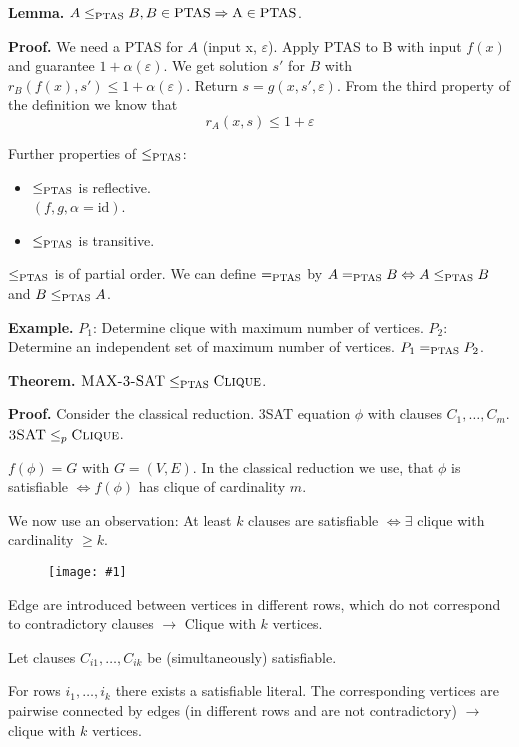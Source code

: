\documentclass[a4paper]{article}
\newcommand{\drawing}[1]{%
 \begin{figure}[ht]
  \begin{center}
   \texttt{[image: \#1]}
  \end{center}
 \end{figure}
}
\newcommand{\cls}[1]{\rm{#1}}
\newcommand{\probl}[1]{\text{\textsc{#1}}}
\begin{document}
\textbf{Lemma.}
  $A \leq_{\cls{PTAS}} B, B \in \cls{PTAS} \Rightarrow A \in \cls{PTAS}$.

\textbf{Proof.}
  We need a PTAS for $A$ (input x, $\varepsilon$).
  Apply PTAS to B with input $f(x)$ and guarantee $1 + \alpha(\varepsilon)$.
  We get solution $s'$ for $B$ with $r_B(f(x), s') \leq 1 + \alpha(\varepsilon)$.
  Return $s = g(x, s', \varepsilon)$. From the third property of the definition
  we know that
\[
  r_A(x, s) \leq 1 + \varepsilon
\]

Further properties of $\leq_{\cls{PTAS}}$:
\begin{itemize}
  \item $\leq_{\cls{PTAS}}$ is reflective. \\
        $(f, g, \alpha = \text{id})$.
  \item $\leq_{\cls{PTAS}}$ is transitive.
\end{itemize}



$\leq_{\cls{PTAS}}$ is of partial order.
We can define $=_{\cls{PTAS}}$ by $A =_{\cls{PTAS}} B \Leftrightarrow
A \leq_{\cls{PTAS}} B$ and $B \leq_{\cls{PTAS}} A$.

\textbf{Example.}
  $P_1$: Determine clique with maximum number of vertices.
  $P_2$: Determine an independent set of maximum number of vertices.
  $P_1 =_{\cls{PTAS}} P_2$.

\textbf{Theorem.}
  $\probl{MAX-3-SAT} \leq_{\cls{PTAS}} \probl{Clique}$.

\textbf{Proof.}
  Consider the classical reduction. 3SAT equation $\phi$
  with clauses $C_1, \ldots, C_m$. $\probl{3SAT} \leq_p \probl{Clique}$.

$f(\phi) = G$ with $G = (V, E)$. In the classical reduction we use,
that $\phi$ is satisfiable $\Leftrightarrow f(\phi)$ has clique of
cardinality $m$.

We now use an observation:
At least $k$ clauses are satisfiable $\Leftrightarrow \exists$ clique
with cardinality $\geq k$.

\drawing{literal_construction.pdf}

Edge are introduced between vertices in different rows, which
do not correspond to contradictory clauses $\rightarrow$ Clique with
$k$ vertices.

Let clauses $C_{i1}, \ldots, C_{ik}$ be (simultaneously) satisfiable.

For rows $i_1, \ldots, i_k$ there exists a satisfiable literal.
The corresponding vertices are pairwise connected by edges (in different
rows and are not contradictory) $\rightarrow$ clique with $k$ vertices.
\end{document}
